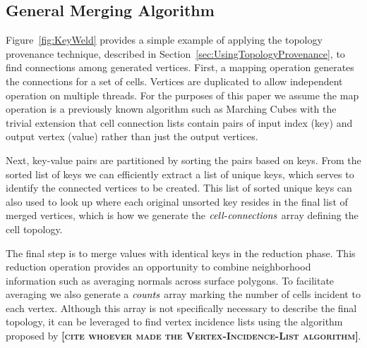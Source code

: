 \documentclass[10pt,journal,cspaper,compsoc]{IEEEtran}
\newcommand{\fix}[1]{{\color{red}\textbf{\textsc{[#1]}}}}
\begin{document}
\subsection{General Merging Algorithm}
\label{sec:GeneralMergingAlgorithm}

Figure~\ref{fig:KeyWeld} provides a simple example of applying the topology
provenance technique, described in
Section~\ref{sec:UsingTopologyProvenance}, to find connections among
generated vertices.  First, a mapping operation generates the connections
for a set of cells.  Vertices are duplicated to allow independent operation
on multiple threads.  For the purposes of this paper we assume the map
operation is a previously known algorithm such as Marching Cubes with the
trivial extension that cell connection lists contain pairs of input index
(key) and output vertex (value) rather than just the output vertices.

Next, key-value pairs are partitioned by sorting the pairs based on keys.
From the sorted list of keys we can efficiently extract a list of unique
keys, which serves to identify the connected vertices to be created.  This
list of sorted unique keys can also used to look up where each original
unsorted key resides in the final list of merged vertices, which is how we
generate the $\id{cell-connections}$ array defining the cell topology.

The final step is to merge values with identical keys in the reduction
phase.  This reduction operation provides an opportunity to combine
neighborhood information such as averaging normals across surface polygons.
To facilitate averaging we also generate a $\id{counts}$ array marking
the number of cells incident to each vertex.  Although this array is not
specifically necessary to describe the final topology, it can be leveraged
to find vertex incidence lists using the algorithm proposed by \fix{cite
  whoever made the Vertex-Incidence-List algorithm}.

\end{document}
